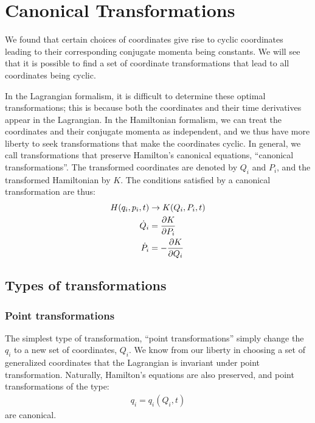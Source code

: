 \chapter{Canonical Transformations}
We found that certain choices of coordinates give rise to cyclic coordinates leading to their corresponding conjugate momenta being constants. We will see that it is possible to find a set of coordinate transformations that lead to all coordinates being cyclic.

In the Lagrangian formalism, it is difficult to determine these optimal transformations; this is because both the coordinates and their time derivatives appear in the Lagrangian. In the Hamiltonian formalism, we can treat the coordinates and their conjugate momenta as independent, and we thus have more liberty to seek transformations that make the coordinates cyclic. In general, we call transformations that preserve Hamilton's canonical equations, ``canonical transformations''. The transformed coordinates are denoted by $Q_i$ and $P_i$, and the transformed Hamiltonian by $K$. The conditions satisfied by a canonical transformation are thus:
\begin{align}
H(q_i,p_i,t)&\to K(Q_i,P_i,t)\nonumber\\
\dot Q_i&=\frac{\partial K}{\partial P_i}\nonumber\\
\dot P_i&=-\frac{\partial K}{\partial Q_i}
\end{align}

\section{Types of transformations}
\subsection{Point transformations}
The simplest type of transformation, ``point transformations'' simply change the $q_i$ to a new set of coordinates, $Q_i$. We know from our liberty in choosing a set of generalized coordinates that the Lagrangian is invariant under point transformation. Naturally, Hamilton's equations are also preserved, and point transformations of the type:
\begin{align}
q_i=q_i(Q_i,t)
\end{align}
are canonical.
